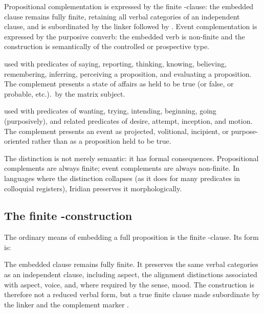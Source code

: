 Propositional complementation is expressed by the finite -clause:
the embedded clause remains fully finite, retaining all verbal categories
of an independent clause, and is subordinated by the linker 
followed by . Event complementation is expressed by the purposive
converb: the embedded verb is non-finite and the construction is semantically
of the controlled or prospective type.

\begin{description}[leftmargin=2em, labelwidth=!, labelindent=0em]
\item[\upshape Propositional complement (\ird{po}):] used with predicates of
	saying, reporting, thinking, knowing, believing, remembering, inferring,
	perceiving a proposition, and evaluating a proposition. The complement
	presents a state of affairs as held to be true (or false, or probable,
	etc.).\ by the matrix subject.
\item[\upshape Event complement (purposive converb):] used with predicates of
	wanting, trying, intending, beginning, going (purposively), and related
	predicates of desire, attempt, inception, and motion. The complement
	presents an event as projected, volitional, incipient, or
	purpose-oriented rather than as a proposition held to be true.
\end{description}

\noindent The distinction is not merely semantic: it has formal consequences.
Propositional complements are always finite; event complements are always
non-finite. In languages where the distinction collapses (as it does for many
predicates in colloquial registers), Iridian preserves it morphologically.

\subsection{The finite -construction}

The ordinary means of embedding a full proposition is the finite
-clause. Its form is:

\begin{center}
\end{center}

The embedded clause remains fully finite. It preserves the same verbal
categories as an independent clause, including aspect, the alignment
distinctions associated with aspect, voice, and, where required by the sense,
mood. The construction is therefore not a reduced verbal form, but a true
finite clause made subordinate by the linker  and the complement
marker .

